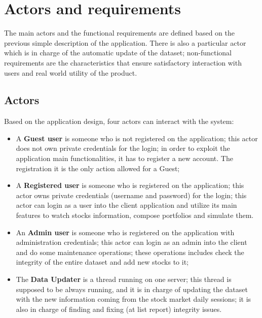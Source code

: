 \chapter{Actors and requirements}
The main actors and the functional requirements are defined based on the previous
simple description of the application. There is also a 
particular actor which is in charge of the automatic update of the dataset; non-functional
requirements are the characteristics that ensure satisfactory interaction with users and 
real world utility of the product.

\section{Actors}
Based on the application design, four actors can interact with the system:
\begin{itemize}
    \item A \textbf{Guest user} is someone who is not registered on the application; this actor does not 
own private credentials for the login; in order to exploit the application main functionalities, 
it has to register a new account. The registration it is the only action allowed for a Guest;

    \item A \textbf{Registered user} is someone who is registered on the application; this actor owns
private credentials (username and password) for the login; this actor can login as a user
into the client
application and utilize its main features to watch stocks information, compose portfolios and 
simulate them. 
   
    \item An \textbf{Admin user} is someone who is registered on the application with administration
credentials; this actor can login as an admin into the client and do some maintenance 
operations; these operations includes check the integrity of the entire dataset and add new 
stocks to it;

    \item The \textbf{Data Updater} is a thread running on one server; this thread is supposed to 
be always running, and it is in charge of updating the dataset with the new information coming from 
the stock market daily sessions; it is also in charge of finding and fixing (at list report)
integrity issues.

\end{itemize}

